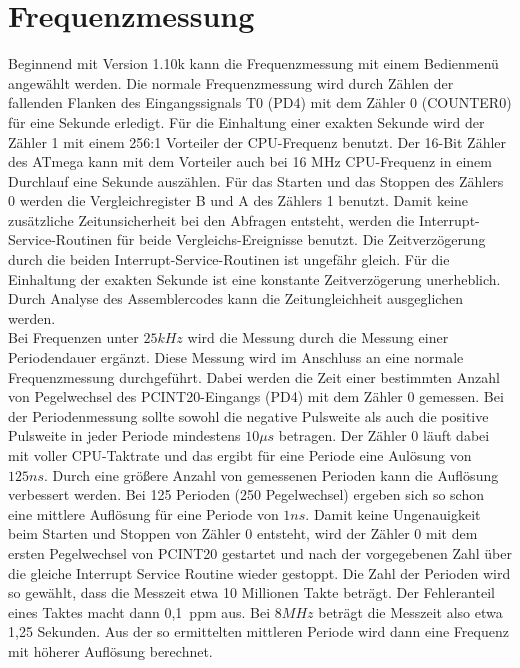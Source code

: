 
\section{Frequenzmessung}
\label{sec:frequency}

Beginnend mit Version 1.10k kann die Frequenzmessung mit einem Bedienmenü angewählt werden.
Die normale Frequenzmessung wird durch Zählen der fallenden Flanken des Eingangssignals T0 (PD4)
mit dem Zähler 0 (COUNTER0) für eine Sekunde erledigt. Für die Einhaltung einer exakten Sekunde
wird der Zähler 1 mit einem 256:1 Vorteiler der CPU-Frequenz benutzt. Der 16-Bit Zähler des ATmega
kann mit dem Vorteiler auch bei 16 MHz CPU-Frequenz in einem Durchlauf eine Sekunde auszählen.
Für das Starten und das Stoppen des Zählers 0 werden die Vergleichregister B und A des Zählers 1
benutzt. Damit keine zusätzliche Zeitunsicherheit bei den Abfragen entsteht, werden die
Interrupt-Service-Routinen für beide Vergleichs-Ereignisse benutzt.
Die Zeitverzögerung durch die beiden Interrupt-Service-Routinen ist ungefähr gleich.
Für die Einhaltung der exakten Sekunde ist eine konstante Zeitverzögerung unerheblich.
Durch Analyse des Assemblercodes kann die Zeitungleichheit ausgeglichen werden.\\

Bei Frequenzen unter \(25kHz\) wird die Messung durch die Messung einer Periodendauer
ergänzt. Diese Messung wird im Anschluss an eine normale Frequenzmessung durchgeführt.
Dabei werden die Zeit einer bestimmten Anzahl von Pegelwechsel des PCINT20-Eingangs (PD4) 
mit dem Zähler 0 gemessen. 
Bei der Periodenmessung sollte sowohl die negative Pulsweite als auch die positive Pulsweite
in jeder Periode mindestens \(10\mu s\) betragen.
Der Zähler 0 läuft dabei mit voller CPU-Taktrate und das ergibt für eine Periode eine
Aulösung von \(125ns\). Durch eine größere Anzahl von gemessenen Perioden kann die Auflösung
verbessert werden. Bei 125 Perioden (250 Pegelwechsel) ergeben sich so schon eine mittlere
Auflösung für eine Periode von \(1ns\). Damit keine Ungenauigkeit beim Starten und
Stoppen von Zähler 0 entsteht, wird der Zähler 0 mit dem ersten Pegelwechsel von
PCINT20 gestartet und nach der vorgegebenen Zahl über die gleiche Interrupt Service Routine
wieder gestoppt.
Die Zahl der Perioden wird so gewählt, dass die Messzeit etwa 10 Millionen Takte beträgt.
Der Fehleranteil eines Taktes macht dann 0,1~ppm aus.
Bei \(8MHz\) beträgt die Messzeit also etwa 1,25 Sekunden.
Aus der so ermittelten mittleren Periode wird dann eine Frequenz mit höherer Auflösung berechnet.

